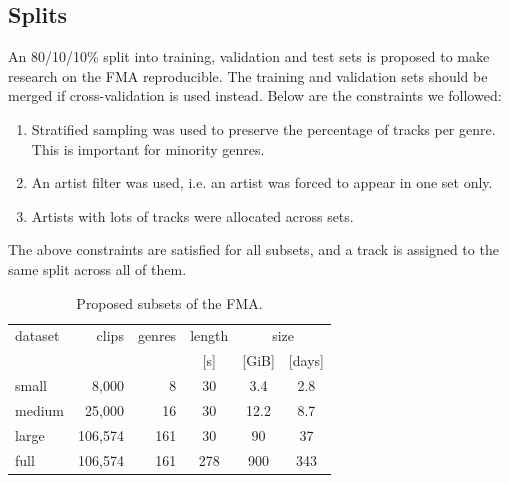 \documentclass{article}
\newcommand{\ntracks}{106,574 }
\newcommand{\tduration}{343 }
\newcommand{\aduration}{278 }
\newcommand{\size}{900 }
\begin{document}
\subsection{Splits}

An 80/10/10\% split into training, validation and test sets is proposed to make research on the FMA reproducible. The training and validation sets should be merged if cross-validation is used instead.
Below are the constraints we followed:
\begin{enumerate}
	\item Stratified sampling was used to preserve the percentage of tracks per genre. This is important for minority genres.
	\item An artist filter was used, i.e. an artist was forced to appear in one set only. %
	\item Artists with lots of tracks were allocated across sets. %
\end{enumerate}
The above constraints are satisfied for all subsets, and a track is assigned to the same split across all of them.

\begin{table}
	\centering
	\begin{tabular}{lrrccc}
		\toprule
		dataset & clips & genres & length & \multicolumn{2}{c}{size} \\
		\cmidrule{5-6}
		        &       &        &  [s]   & [GiB] & [days] \\
		\midrule
		small  &    8,000 &   8 &  30 & 3.4  & 2.8  \\
		medium &   25,000 &  16 &  30 & 12.2 & 8.7  \\
		large  & \ntracks & 161 &  30 & 90   & 37 \\
		full   & \ntracks & 161 & \aduration & \size & \tduration  \\
		\bottomrule
	\end{tabular}
	\caption{Proposed subsets of the FMA.}
	\label{tab:subsets}
\end{table}
\end{document}
